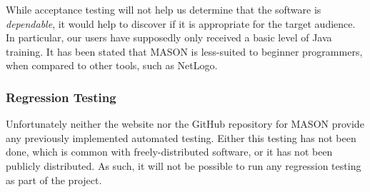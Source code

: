 \documentclass[11pt]{article}
\begin{document}
While acceptance testing will not help us determine that the software is \textit{dependable}, it would help to discover if it is appropriate for the target audience. In particular, our users have supposedly only received a basic level of Java training. It has been stated that MASON is less-suited to beginner programmers, when compared to other tools, such as NetLogo\cite{abm_platforms_review}.


\subsubsection{Regression Testing}
Unfortunately neither the website nor the GitHub repository for MASON provide any previously implemented automated testing.
Either this testing has not been done, which is common with freely-distributed software, or it has not been publicly distributed.
As such, it will not be possible to run any regression testing as part of the project.

\newpage
\end{document}
